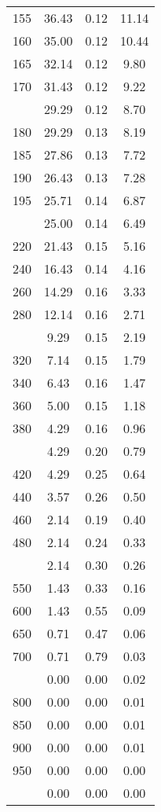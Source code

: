 \begin{table}[ht]
\begin{tabular}{lccc}
  155 & 36.43 & 0.12 & 11.14 \\ 
  160 & 35.00 & 0.12 & 10.44 \\ 
  165 & 32.14 & 0.12 & 9.80 \\ 
  170 & 31.43 & 0.12 & 9.22 \\ 
   \addlinespace
175 & 29.29 & 0.12 & 8.70 \\ 
  180 & 29.29 & 0.13 & 8.19 \\ 
  185 & 27.86 & 0.13 & 7.72 \\ 
  190 & 26.43 & 0.13 & 7.28 \\ 
  195 & 25.71 & 0.14 & 6.87 \\ 
   \addlinespace
200 & 25.00 & 0.14 & 6.49 \\ 
  220 & 21.43 & 0.15 & 5.16 \\ 
  240 & 16.43 & 0.14 & 4.16 \\ 
  260 & 14.29 & 0.16 & 3.33 \\ 
  280 & 12.14 & 0.16 & 2.71 \\ 
   \addlinespace
300 & 9.29 & 0.15 & 2.19 \\ 
  320 & 7.14 & 0.15 & 1.79 \\ 
  340 & 6.43 & 0.16 & 1.47 \\ 
  360 & 5.00 & 0.15 & 1.18 \\ 
  380 & 4.29 & 0.16 & 0.96 \\ 
   \addlinespace
400 & 4.29 & 0.20 & 0.79 \\ 
  420 & 4.29 & 0.25 & 0.64 \\ 
  440 & 3.57 & 0.26 & 0.50 \\ 
  460 & 2.14 & 0.19 & 0.40 \\ 
  480 & 2.14 & 0.24 & 0.33 \\ 
   \addlinespace
500 & 2.14 & 0.30 & 0.26 \\ 
  550 & 1.43 & 0.33 & 0.16 \\ 
  600 & 1.43 & 0.55 & 0.09 \\ 
  650 & 0.71 & 0.47 & 0.06 \\ 
  700 & 0.71 & 0.79 & 0.03 \\ 
   \addlinespace
750 & 0.00 & 0.00 & 0.02 \\ 
  800 & 0.00 & 0.00 & 0.01 \\ 
  850 & 0.00 & 0.00 & 0.01 \\ 
  900 & 0.00 & 0.00 & 0.01 \\ 
  950 & 0.00 & 0.00 & 0.00 \\ 
   \addlinespace
1000 & 0.00 & 0.00 & 0.00 \\ 
   \bottomrule
\end{tabular}
\end{table}
